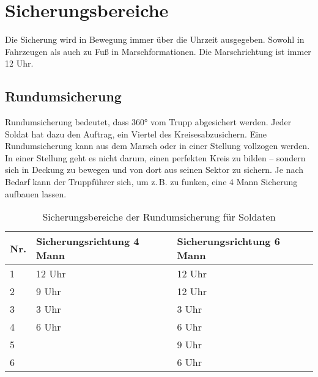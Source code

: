 \pagebreak

\section{Sicherungsbereiche}
Die Sicherung wird in Bewegung immer über die Uhrzeit ausgegeben. Sowohl in Fahrzeugen als auch zu Fuß in Marschformationen. Die Marschrichtung ist immer 12 Uhr.

\subsection{Rundumsicherung}
Rundumsicherung bedeutet, dass 360° vom Trupp abgesichert werden. Jeder Soldat hat dazu den Auftrag, ein Viertel des \glqq Kreises\grqq\space abzusichern. Eine Rundumsicherung kann aus dem Marsch oder in einer Stellung vollzogen werden. In einer Stellung geht es nicht darum, einen perfekten Kreis zu bilden -- sondern sich in Deckung zu bewegen und von dort aus seinen Sektor zu sichern. Je nach Bedarf kann der Truppführer sich, um z.\,B. zu funken, eine 4 Mann Sicherung aufbauen lassen.
\begin{table}[h]	
	\caption{Sicherungsbereiche der Rundumsicherung für Soldaten}
	\vspace{2.5mm}
	\label{tab:360er}
	\centering
	\begin{tabular}{lll}
		\toprule
		Nr. & Sicherungsrichtung 4 Mann & Sicherungsrichtung 6 Mann\\
		\midrule
		1 & 12 Uhr 	& 12 Uhr\\
		2 & 9 Uhr	& 12 Uhr\\
		3 & 3 Uhr	& 3 Uhr\\
		4 & 6 Uhr	& 6 Uhr\\
		5 &			& 9 Uhr\\
		6 &			& 6 Uhr\\
		\bottomrule
	 \end{tabular}
\end{table}
		
\begin{figure}[h]
	\centering
	\label{fig:360er}
\end{figure}


